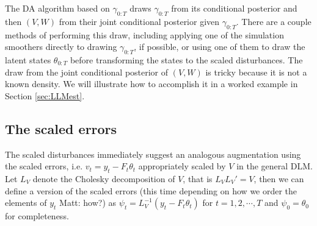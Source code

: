 \documentclass{article}
\newcommand{\matt}[1]{{\color{red} Matt: #1}}
\begin{document}
The DA algorithm based on $\gamma_{0:T}$ draws $\gamma_{0:T}$ from its conditional posterior and then $(V,W)$ from their joint conditional posterior given $\gamma_{0:T}$. There are a couple methods of performing this draw, including applying one of the simulation smoothers directly to drawing $\gamma_{0:T}$, if possible, or using one of them to draw the latent states $\theta_{0:T}$ before transforming the states to the scaled disturbances. The draw from the joint conditional posterior of $(V,W)$ is tricky because it is not a known density. We will illustrate how to accomplish it in a worked example in Section \ref{sec:LLMest}.

\subsection{The scaled errors}\label{sec:scalederrors}
The scaled disturbances immediately suggest an analogous augmentation using the scaled errors, i.e. $v_t=y_t - F_t\theta_t$ appropriately scaled by $V$ in the general DLM. Let $L_V$ denote the Cholesky decomposition of $V$, that is $L_VL_V'=V$, then we can define a version of the scaled errors (this time depending on how we order the elements of $y_t$ \matt{how?}) as $\psi_t = L_V^{-1}(y_t - F_t\theta_t)$ for $t=1,2,\cdots,T$ and $\psi_0 = \theta_0$ for completeness. 

\end{document}
